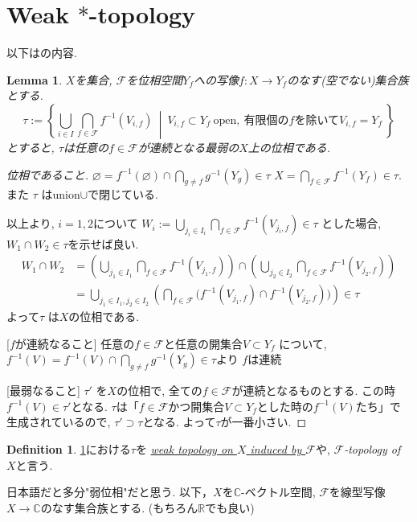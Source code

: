 \documentclass[dvipdfmx,a4paper,11pt]{article} %
\newtheorem{lem}[thm]{Lemma}
\theoremstyle{definition}
\newtheorem{defn}[thm]{Definition}
\theoremstyle{remark}
\numberwithin{equation}{section}
\newcommand{\R}{\mathbb{R}}
\newcommand{\C}{\mathbb{C}}
\begin{document}
\section{Weak $*$-topology}
以下は\cite[3.8-3.14]{Rud}の内容. 

\begin{tcolorbox}[mybox]
\begin{lem}%
\label{lem-H-10}
\(X\)を集合,  \(\mathscr{F}\)を位相空間$Y_f$への写像\(f : X \to Y_f\)のなす(空でない)集合族とする. 
\[
\tau := \left\{ \bigcup_{i \in I} \bigcap_{f \in \mathscr{F}} f^{-1}(V_{i, f}) \ \middle|\ V_{i, f} \subset Y_f \ \text{open}, \ \text{有限個の$f$を除いて} V_{i, f}= Y_f \  \right\}
\]
とすると, \(\tau\)は任意の$f \in \mathscr{F}$が連続となる最弱の$X$上の位相である.
\end{lem}
\end{tcolorbox}
\begin{proof}
[位相であること]
\(\varnothing = f^{-1}(\varnothing) \cap \bigcap_{g \neq f} g^{-1}(Y_g)  \in \tau\)
 \(X= \bigcap_{f \in \mathscr{F}}f^{-1}(Y_f) \in \tau\).  
また \(\tau\) はunion$\cup$で閉じている.  

以上より, $i=1,2$について
\(W_i := \bigcup_{j_i \in I_i} \bigcap_{f \in \mathscr{F}} f^{-1}(V_{j_i, f})\in \tau \)
とした場合, $W_1 \cap W_2 \in \tau$を示せば良い. 
\begin{align*}
W_1 \cap W_2 
&= \left(\bigcup_{j_1 \in I_1} \bigcap_{f \in \mathscr{F}} f^{-1}(V_{j_1, f}) \right)
\cap 
\left( \bigcup_{j_2 \in I_2} \bigcap_{f \in \mathscr{F}} f^{-1}(V_{j_2, f}) \right)\\
&= 
\bigcup_{j_1 \in I_1, j_2 \in I_2} 
\left( \bigcap_{f \in \mathscr{F}} \big( f^{-1}(V_{j_1, f}) \cap f^{-1}(V_{j_2, f}) \big) 
\right)
\in \tau
\end{align*}
よって\(\tau\) は$X$の位相である. 

[$f$が連続なること]
任意の\(f \in \mathscr{F}\)と任意の開集合\(V \subset Y_f\) について, 
\(f^{-1}(V) = f^{-1}(V)\cap \bigcap_{g \neq f}  g^{-1}(Y_g) \in \tau\)より
\(f\)は連続

[最弱なること]
\(\tau'\) を\(X\)の位相で, 全ての\(f \in \mathscr{F}\)が連続となるものとする. 
この時\(f^{-1}(V) \in \tau'\)となる. 
\(\tau\)は「\(f \in \mathscr{F}\)かつ開集合\(V \subset Y_f\)とした時の\(f^{-1}(V)\)たち」で生成されているので, 
\( \tau' \supset \tau\)となる.
よって$\tau$が一番小さい. 
\end{proof}

\begin{tcolorbox}[mybox]
\begin{defn}%
\label{defn-H-11}
\ref{lem-H-10}における\(\tau\)を
\underline{\emph{weak topology on \(X\) induced by \(\mathscr{F}\)}}や, \emph{\(\mathscr{F}\)-topology of \(X\)}と言う. 
\end{defn}
\end{tcolorbox}
日本語だと多分"弱位相"だと思う. 
以下，\(X\)を$\C$-ベクトル空間,  \(\mathscr{F}\)を線型写像$X \to \C$のなす集合族とする. 
(もちろん$\R$でも良い)
\end{document}
